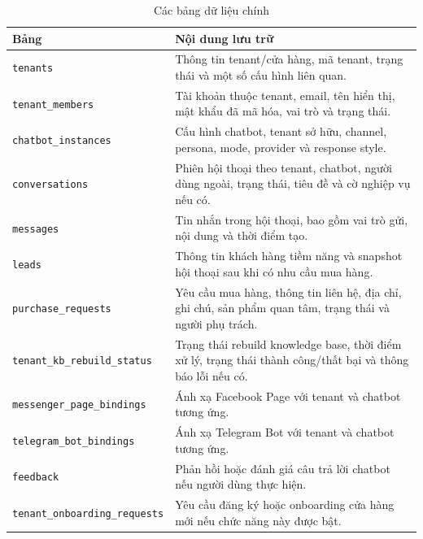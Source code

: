 \documentclass[../DoAn.tex]{subfiles}
\begin{document}
%

\begin{table}[H]
\centering
\caption{Các bảng dữ liệu chính}
\label{tab:ch4-database-main}
\begin{tabular}{|p{}|p{}|}
\hline
\textbf{Bảng} & \textbf{Nội dung lưu trữ} \\
\hline
\texttt{tenants} & Thông tin tenant/cửa hàng, mã tenant, trạng thái và một số cấu hình liên quan. \\
\hline
\texttt{tenant\_members} & Tài khoản thuộc tenant, email, tên hiển thị, mật khẩu đã mã hóa, vai trò và trạng thái. \\
\hline
\texttt{chatbot\_instances} & Cấu hình chatbot, tenant sở hữu, channel, persona, mode, provider và response style. \\
\hline
\texttt{conversations} & Phiên hội thoại theo tenant, chatbot, người dùng ngoài, trạng thái, tiêu đề và cờ nghiệp vụ nếu có. \\
\hline
\texttt{messages} & Tin nhắn trong hội thoại, bao gồm vai trò gửi, nội dung và thời điểm tạo. \\
\hline
\texttt{leads} & Thông tin khách hàng tiềm năng và snapshot hội thoại sau khi có nhu cầu mua hàng. \\
\hline
\texttt{purchase\_requests} & Yêu cầu mua hàng, thông tin liên hệ, địa chỉ, ghi chú, sản phẩm quan tâm, trạng thái và người phụ trách. \\
\hline
\texttt{tenant\_kb\_rebuild\_status} & Trạng thái rebuild knowledge base, thời điểm xử lý, trạng thái thành công/thất bại và thông báo lỗi nếu có. \\
\hline
\texttt{messenger\_page\_bindings} & Ánh xạ Facebook Page với tenant và chatbot tương ứng. \\
\hline
\texttt{telegram\_bot\_bindings} & Ánh xạ Telegram Bot với tenant và chatbot tương ứng. \\
\hline
\texttt{feedback} & Phản hồi hoặc đánh giá câu trả lời chatbot nếu người dùng thực hiện. \\
\hline
\texttt{tenant\_onboarding\_requests} & Yêu cầu đăng ký hoặc onboarding cửa hàng mới nếu chức năng này được bật. \\
\hline
\end{tabular}
\end{table}
\end{document}
